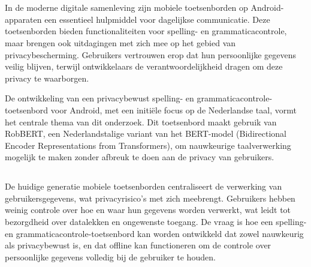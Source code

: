 
\chapter{}%
\label{ch:inleiding}

In de moderne digitale samenleving zijn mobiele toetsenborden op Android-app\-ara\-ten een essentieel hulpmiddel voor dagelijkse communicatie. Deze toetsenborden bieden functionaliteiten voor spelling- en grammaticacontrole, maar brengen ook uitdagingen met zich mee op het gebied van privacybescherming. Gebruikers vertrouwen erop dat hun persoonlijke gegevens veilig blijven, terwijl ontwikkelaars de verantwoordelijkheid dragen om deze privacy te waarborgen.

De ontwikkeling van een privacybewust spelling- en grammaticacontrole-toet\-sen\-bord voor Android, met een initiële focus op de Nederlandse taal, vormt het centrale thema van dit onderzoek. Dit toetsenbord maakt gebruik van RobBERT, een Nederlandstalige variant van het BERT-model (Bidirectional Encoder Representations from Transformers), om nauwkeurige taalverwerking mogelijk te maken zonder afbreuk te doen aan de privacy van gebruikers.

\section{}%
\label{sec:probleemstelling}

De huidige generatie mobiele toetsenborden centraliseert de verwerking van gebruikersgegevens, wat privacyrisico's met zich meebrengt. Gebruikers hebben weinig controle over hoe en waar hun gegevens worden verwerkt, wat leidt tot bezorgdheid over datalekken en ongewenste toegang. De vraag is hoe een spelling- en grammaticacontrole-toetsenbord kan worden ontwikkeld dat zowel nauwkeurig als privacybewust is, en dat offline kan functioneren om de controle over persoonlijke gegevens volledig bij de gebruiker te houden.

\section{}%
\label{sec:onderzoeksvraag}

